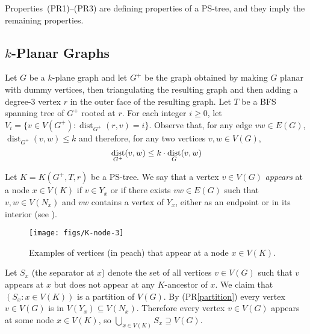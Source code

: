 \documentclass{patmorin}
\DeclareMathOperator{\dist}{dist}
\begin{document}
Properties~(PR1)--(PR3) are defining properties of a PS-tree, and they imply the remaining properties. 

% 
% 

\subsection{$k$-Planar Graphs}

Let $G$ be a $k$-plane graph and let $G^+$ be the graph obtained by making $G$ planar with dummy vertices, then triangulating the resulting graph and then adding a degree-3 vertex $r$ in the outer face of the resulting graph. Let $T$ be a BFS spanning tree of $G^+$ rooted at $r$. For each integer $i\ge 0$, let $V_i=\{v\in V(G^+): \dist_{G^+}(r,v)=i\}$.  Observe that, for any edge $vw\in E(G)$, $\dist_{G^+}(v,w) \le k$ and therefore, for any two vertices $v,w\in V(G)$,
\begin{equation}
  \dist_{G^+}(v,w) \le k\cdot \dist_G(v,w) \eqlabel{distance-preserving}
\end{equation}

Let $K=K(G^+,T,r)$ be a PS-tree.  We say that a vertex $v\in V(G)$ \emph{appears} at a node $x\in V(K)$ if $v\in Y_x$ or if there exists $vw\in E(G)$ such that $v,w\in V(N_x)$ and $vw$ contains a vertex of $Y_x$, either as an endpoint or in its interior (see ).

\begin{figure}
  \begin{center}
    \texttt{[image: figs/K-node-3]}
  \end{center}
  \caption{Examples of vertices (in peach) that appear at a node $x\in V(K)$.}
\end{figure}

Let $S_x$ (the separator at $x$) denote the set of all vertices $v\in V(G)$ such that $v$ appears at $x$ but does not appear at any $K$-ancestor of $x$.  We claim that $(S_x:x\in V(K))$ is a partition of $V(G)$. By (PR\ref{partition}) every vertex $v\in  V(G)$ is in $V(Y_x)\subseteq V(N_x)$. Therefore every vertex $v\in V(G)$ appears at some node $x\in V(K)$, so $\bigcup_{x\in V(K)} S_x \supseteq V(G)$.
\end{document}
